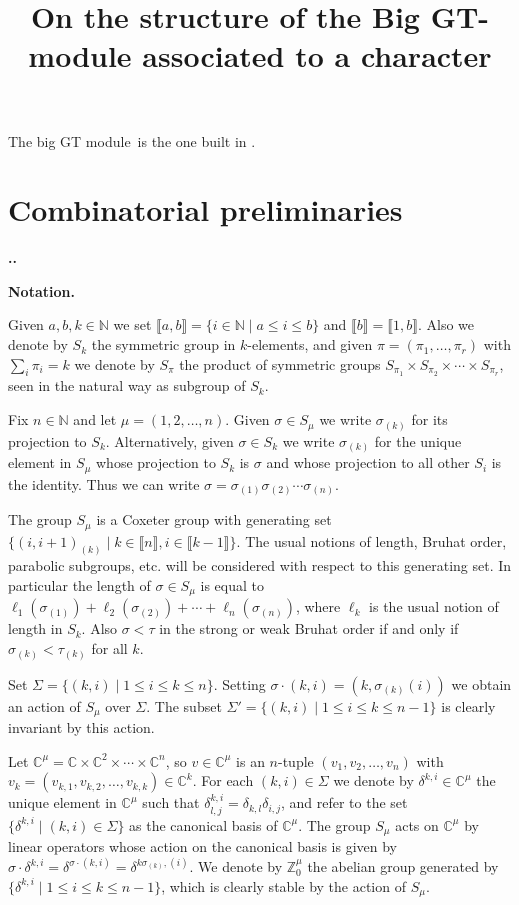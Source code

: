 \documentclass[11pt,fleqn]{amsart}
\title{On the structure of the Big GT-module associated to a character}
\date{}
\renewcommand\thesection{\arabic{section}}
\newcounter{para}[section]
\renewcommand\thepara{\thesection.\arabic{para}}
\def\paragraph{%
 \noindent
 \refstepcounter{para}%
 \textbf{\thepara.}\hspace{1ex}%
}
\newcommand\about[1]{%
 {\bfseries#1.}%
}
\newcommand\NN{\mathbb N}
\newcommand\CC{\mathbb C}
\newcommand\ZZ{\mathbb Z}
\newcommand\interval[1]{\llbracket #1 \rrbracket}
\newcommand\bigmodule{big GT module~}
\begin{document}
\maketitle
The \bigmodule is the one built in \cite{RZ18}.

\section{Combinatorial preliminaries}

\paragraph
\about{Notation}
\label{notation}
Given $a,b,k \in \NN$ we set $\interval{a,b} = \{i \in \NN \mid a \leq i \leq 
b\}$ and $\interval{b} = \interval{1,b}$. Also we denote by $S_k$ the 
symmetric group in $k$-elements, and given $\pi = (\pi_1, \ldots, \pi_r)$
with $\sum_i \pi_i = k$ we denote by $S_\pi$ the product of symmetric groups
$S_{\pi_1} \times S_{\pi_2} \times \cdots \times S_{\pi_r}$, seen in the 
natural way as subgroup of $S_k$.

Fix $n \in \NN$ and let $\mu = (1, 2, \ldots, n)$. Given $\sigma \in S_\mu$ we 
write $\sigma_{(k)}$ for its projection to $S_k$. Alternatively, given $\sigma 
\in S_k$ we write $\sigma_{(k)}$ for the unique element in $S_\mu$ whose 
projection to $S_k$ is $\sigma$ and whose projection to all other $S_i$ is the
identity. Thus we can write $\sigma = \sigma_{(1)} \sigma_{(2)} \cdots 
\sigma_{(n)}$.

The group $S_\mu$ is a Coxeter group with generating set $\{(i,i+1)_{(k)}
\mid k \in \interval{n}, i \in \interval{k-1}\}$. The usual notions of length,
Bruhat order, parabolic subgroups, etc. will be considered with respect to 
this generating set. In particular the length of $\sigma \in 
S_\mu$ is equal to $\ell_1(\sigma_{(1)}) + \ell_2(\sigma_{(2)}) + \cdots + 
\ell_n(\sigma_{(n)})$, where $\ell_k$ is the usual notion of length in $S_k$.
Also $\sigma < \tau$ in the strong or weak Bruhat order if and only if 
$\sigma_{(k)} < \tau_{(k)}$ for all $k$.

Set $\Sigma = \{(k,i) \mid 1 \leq i \leq k \leq n\}$. Setting $\sigma \cdot 
(k,i) = (k, \sigma_{(k)}(i))$ we obtain an action of $S_\mu$ over $\Sigma$.
The subset $\Sigma' = \{(k,i) \mid 1 \leq i \leq k \leq n-1\}$ is clearly 
invariant by this action. 

Let $\CC^\mu = \CC \times \CC^2 \times \cdots \times \CC^n$, so $v \in \CC^\mu$
is an $n$-tuple $(v_1, v_2, \ldots, v_n)$ with $v_k = (v_{k,1}, v_{k,2},
\ldots, v_{k,k}) \in \CC^k$. For each $(k,i) \in \Sigma$ we denote by 
$\delta^{k,i} \in \CC^\mu$ the unique element in $\CC^\mu$ such that 
$\delta^{k,i}_{l,j} = \delta_{k,l} \delta_{i,j}$, and refer to the set 
$\{\delta^{k,i}\mid (k,i) \in \Sigma\}$ as the canonical basis of $\CC^\mu$. 
The group $S_\mu$ acts on $\CC^\mu$ by linear operators whose action on the 
canonical basis is given by $\sigma \cdot \delta^{k,i} = \delta^{\sigma \cdot 
(k,i)} = \delta^{k \sigma_{(k)}, (i)}$. We denote by $\ZZ^\mu_0$ the abelian 
group generated by $\{\delta^{k,i} \mid 1 \leq i \leq k \leq n-1\}$, which is 
clearly stable by the action of $S_\mu$.
\end{document}
